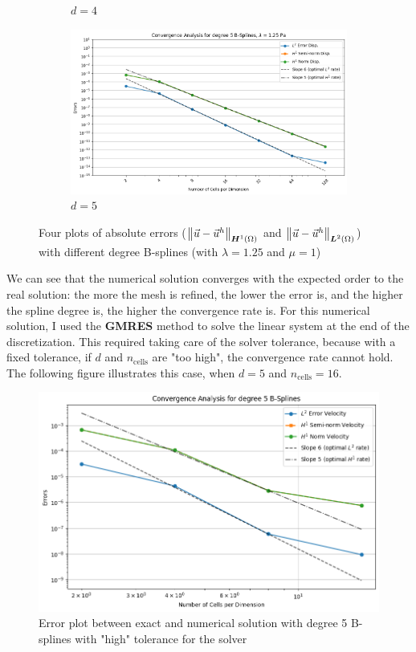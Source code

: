 \documentclass[a4paper,12pt,twoside]{report}
\begin{document}
\begin{figure}[!h]
\begin{subfigure}[b]{0.49\textwidth}
		\caption{$d=4$}
		\label{fig:deg4_NMDHBC}
	\end{subfigure}
	\begin{subfigure}[b]{0.49\textwidth}
		\centering
		\includegraphics[width=\textwidth]{figures/figures_non_mixed_DH/convergence_plot_degree_5_lambda=1.25.png}
		\caption{$d=5$}
		\label{fig:deg5_NMDHBC}
	\end{subfigure}
	\caption{Four plots of absolute errors ($\norm{\vec u - \vec u^h}_{\boldsymbol H^1(\Omega)}$ and $\norm{\vec u - \vec u^h}_{\boldsymbol L^2(\Omega)}$) with different degree B-splines (with $\lambda = 1.25$ and $\mu = 1$)}
	\label{fig:four_errors_graphs_1}
\end{figure}

We can see that the numerical solution converges with the expected order to the real solution: the more the mesh is refined, the lower the error is, and the higher the spline degree is, the higher the convergence rate is. 
For this numerical solution, I used the \textbf{GMRES} method to solve the linear system at the end of the discretization. This required taking care of the solver tolerance, because with a fixed tolerance, if $d$ and $n_{\text{cells}}$ are "too high", the convergence rate cannot hold. The following figure illustrates this case, when $d=5$ and $n_{\text{cells}} = 16$.

\newpage
\begin{figure}[!h]
	\centering
	\includegraphics[width=0.7\linewidth]{figures/degre5_nul}
	\caption{Error plot between exact and numerical solution with degree 5 B-splines with "high" tolerance for the solver}
\end{figure}
\end{document}
